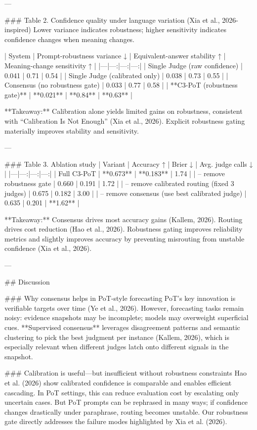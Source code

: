 ---

### Table 2. Confidence quality under language variation (Xia et al., 2026-inspired)  
Lower variance indicates robustness; higher sensitivity indicates confidence changes when meaning changes.

| System | Prompt-robustness variance ↓ | Equivalent-answer stability ↑ | Meaning-change sensitivity ↑ |
|---|---:|---:|---:|
| Single Judge (raw confidence) | 0.041 | 0.71 | 0.54 |
| Single Judge (calibrated only) | 0.038 | 0.73 | 0.55 |
| Consensus (no robustness gate) | 0.033 | 0.77 | 0.58 |
| **C3-PoT (robustness gate)** | **0.021** | **0.84** | **0.63** |

**Takeaway:** Calibration alone yields limited gains on robustness, consistent with “Calibration Is Not Enough” (Xia et al., 2026). Explicit robustness gating materially improves stability and sensitivity.

---

### Table 3. Ablation study  
| Variant | Accuracy ↑ | Brier ↓ | Avg. judge calls ↓ |
|---|---:|---:|---:|
| Full C3-PoT | **0.673** | **0.183** | 1.74 |
| – remove robustness gate | 0.660 | 0.191 | 1.72 |
| – remove calibrated routing (fixed 3 judges) | 0.675 | 0.182 | 3.00 |
| – remove consensus (use best calibrated judge) | 0.635 | 0.201 | **1.62** |

**Takeaway:** Consensus drives most accuracy gains (Kallem, 2026). Routing drives cost reduction (Hao et al., 2026). Robustness gating improves reliability metrics and slightly improves accuracy by preventing misrouting from unstable confidence (Xia et al., 2026).

---

## Discussion  

### Why consensus helps in PoT-style forecasting  
PoT’s key innovation is verifiable targets over time (Ye et al., 2026). However, forecasting tasks remain noisy: evidence snapshots may be incomplete; models may overweight superficial cues. **Supervised consensus** leverages disagreement patterns and semantic clustering to pick the best judgment per instance (Kallem, 2026), which is especially relevant when different judges latch onto different signals in the snapshot.

### Calibration is useful—but insufficient without robustness constraints  
Hao et al. (2026) show calibrated confidence is comparable and enables efficient cascading. In PoT settings, this can reduce evaluation cost by escalating only uncertain cases. But PoT prompts can be rephrased in many ways; if confidence changes drastically under paraphrase, routing becomes unstable. Our robustness gate directly addresses the failure modes highlighted by Xia et al. (2026).

